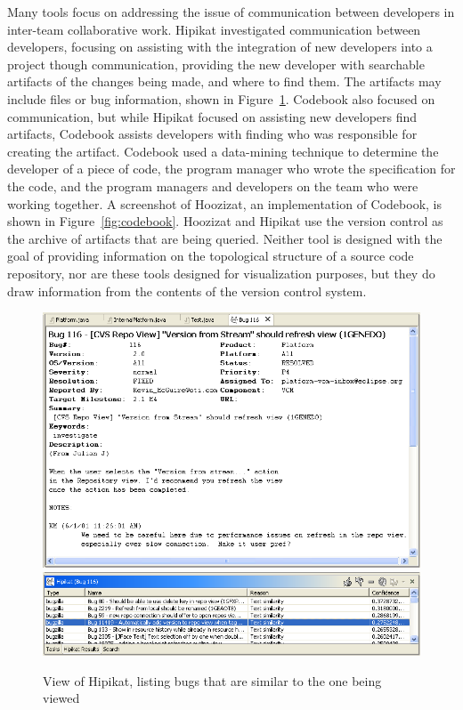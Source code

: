Many tools focus on addressing the issue of communication between
developers in inter-team collaborative work. Hipikat\cite{Cubranic2005}
investigated communication between developers, focusing on assisting
with the integration of new developers into a project though
communication, providing the new developer with searchable artifacts of
the changes being made, and where to find them. The artifacts may
include files or bug information, shown in Figure~\ref{fig:hipikat}.
Codebook\cite{Begel2010} also focused on communication, but while
Hipikat focused on assisting new developers find artifacts, Codebook
assists developers with finding who was responsible for creating the
artifact. Codebook used a data-mining technique to determine the
developer of a piece of code, the program manager who wrote the
specification for the code, and the program managers and developers on
the team who were working together. A screenshot of Hoozizat, an
implementation of Codebook, is shown in Figure~\ref{fig:codebook}.
Hoozizat and Hipikat use the version control as the archive of artifacts
that are being queried. Neither tool is designed with the goal of
providing information on the topological structure of a source code
repository, nor are these tools designed for visualization purposes, but
they do draw information from the contents of the version control
system.

\begin{figure}[htpb]
  \centering
  \includegraphics[width=0.9\linewidth]{Figures/introduction/hipikat_bug.png}
  \includegraphics[width=0.9\linewidth]{Figures/introduction/hipikat.png}
  \caption{View of Hipikat, listing bugs that are similar to the one
  being viewed}
  \label{fig:hipikat}
\end{figure}

